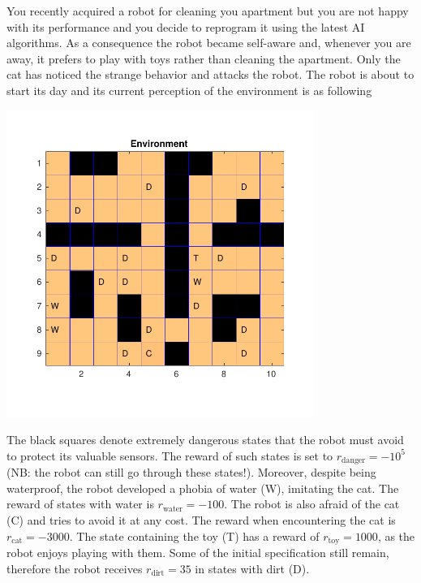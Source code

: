 
\newif\ifvimbug
\vimbugfalse

\ifvimbug

\fi


You recently acquired a robot for cleaning you apartment but you are not happy with its performance and you decide to reprogram it using the latest AI algorithms. As a consequence the robot became self-aware and, whenever you are away, it prefers to play with toys rather than cleaning the apartment. Only the cat has noticed the strange behavior and attacks the robot. The robot is about to start its day and its current perception of the environment is as following 
%
\begin{center}
	\includegraphics[width=0.75\textwidth]{gridworld.pdf}
\end{center}
%
The black squares denote extremely dangerous states that the robot must avoid to protect its valuable sensors. The reward of such states is set to $r_\textrm{danger}=-10^5$ (NB: the robot can still go through these states!). Moreover, despite being waterproof, the robot developed a phobia of water (W), imitating the cat. The reward of states with water is $r_\textrm{water}=-100$. The robot is also afraid of the cat (C) and tries to avoid it at any cost. The reward when encountering the cat is $r_\textrm{cat}=-3000$. The state containing the toy (T) has a reward of $r_\textrm{toy}=1000$, as the robot enjoys playing with them. Some of the initial specification still remain, therefore the robot receives $r_\textrm{dirt}=35$ in states with dirt (D).

